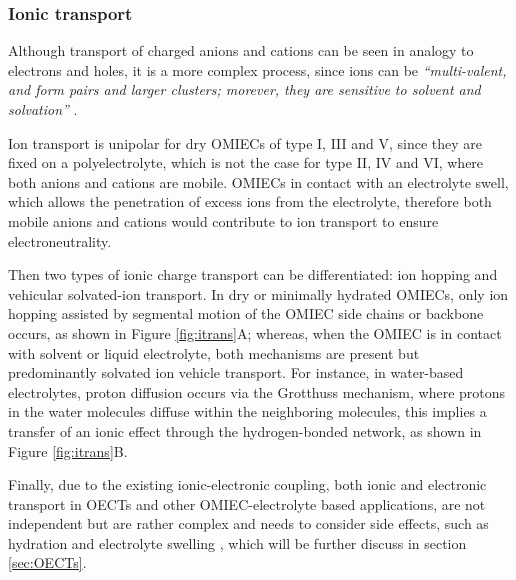 \subsubsection{Ionic transport}
Although transport of charged anions and cations can be seen in analogy to electrons and holes, it is a more complex process, since ions can be \textit{``multi-valent, and form pairs and larger clusters; morever, they are sensitive to solvent and solvation''} \cite{paulsenOrganicMixedIonic2020}.

Ion transport is unipolar for dry OMIECs of type I, III and V, since they are fixed on a polyelectrolyte, which is not the case for type II, IV and VI, where both anions and cations are mobile. OMIECs in contact with an electrolyte swell, which allows the penetration of excess ions from the electrolyte, therefore both mobile anions and cations would contribute to ion transport to ensure electroneutrality. 

Then two types of ionic charge transport can be differentiated: ion hopping and vehicular solvated-ion transport. In dry or minimally hydrated OMIECs, only ion hopping assisted by segmental motion of the OMIEC side chains or backbone occurs, as shown in Figure \ref{fig:itrans}A; whereas, when the OMIEC is in contact with solvent or liquid electrolyte, both mechanisms are present but predominantly solvated ion vehicle transport. For instance, in water-based electrolytes, proton diffusion occurs via the Grotthuss mechanism, where protons in the water molecules diffuse within the neighboring molecules, this implies a transfer of an ionic effect through the hydrogen-bonded network, as shown in Figure \ref{fig:itrans}B.

Finally, due to the existing ionic-electronic coupling, both ionic and electronic transport in OECTs and other OMIEC-electrolyte based applications, are not independent but are rather complex and needs to consider side effects, such as hydration and electrolyte swelling \cite{paulsenOrganicMixedIonic2020}, which will be further discuss in section \ref{sec:OECTs}.

